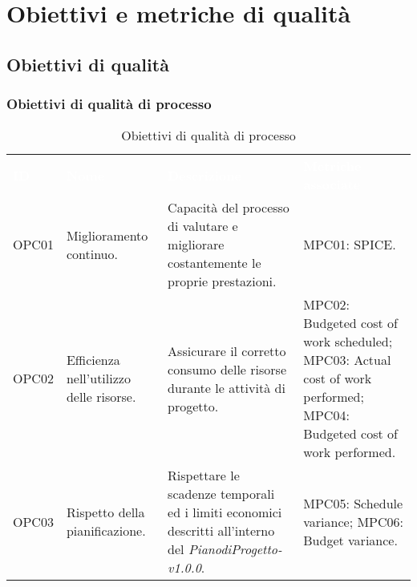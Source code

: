 \section{Obiettivi e metriche di qualità}

\subsection{Obiettivi di qualità}

\subsubsection{Obiettivi di qualità di processo}

\begin{table}[H]
    \renewcommand{\arraystretch}{1.5}
    \begin{tabular}{ m{}<{\centering}  m{}<{\centering}  m{}<{\centering}  m{}<{\centering} }
        \rowcolor{darkblue}
        \textcolor{white}{\textbf{ID}} &\textcolor{white}{\textbf{Nome}}& \textcolor{white}{\textbf{Descrizione}} & \textcolor{white}{\textbf{Metriche associate}}\\ 
        
        OPC01 & 
        Miglioramento continuo. &
        Capacità del processo di valutare e migliorare costantemente le proprie prestazioni. &
        MPC01: SPICE. \\
        
        \rowcolor{gray!25}
        OPC02 &
        Efficienza nell’utilizzo delle risorse. &
        Assicurare il corretto consumo delle risorse durante le attività di progetto. &
        MPC02: Budgeted cost of work scheduled; \newline
        MPC03: Actual cost of work performed; \newline
        MPC04: Budgeted cost of work performed. \\

        OPC03 &
        Rispetto della pianificazione. &
        Rispettare le scadenze temporali ed i limiti economici descritti all’interno del \textit{PianodiProgetto-v1.0.0}. &
        MPC05: Schedule variance; \newline
        MPC06: Budget variance. \\

    \end{tabular}
    \caption{Obiettivi di qualità di processo}
\end{table}

